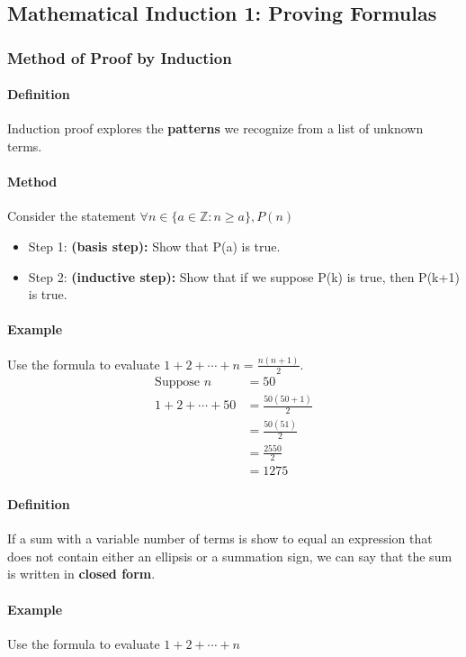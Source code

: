 \subsection{Mathematical Induction 1: Proving Formulas}
\hrulefill

\subsubsection*{Method of Proof by Induction}
\paragraph*{Definition}
Induction proof explores the \textbf{patterns} we recognize from a list of unknown terms.

\paragraph*{Method}
Consider the statement $\forall n \in \{a \in \mathbb{Z} : n \geq a\}, P(n)$
\begin{itemize}
    \item Step 1: \textbf{(basis step):} Show that P(a) is true.
    \item Step 2: \textbf{(inductive step):} Show that if we suppose P(k) is true, then P(k+1) is true.
\end{itemize}

\paragraph*{Example}
Use the formula to evaluate $1 + 2 + \cdots + n = \frac{n(n+1)}{2}$.
\begin{align*}
    \text{Suppose } n &= 50\\
    1 + 2 + \cdots + 50 &= \frac{50(50+1)}{2}\\
    &= \frac{50(51)}{2}\\
    &= \frac{2550}{2}\\
    &= 1275
\end{align*}


\paragraph*{Definition} If a sum with a variable number of terms is show to equal an expression that does not contain either an ellipsis 
or a summation sign, we can say that the sum is written in \textbf{closed form}.

\paragraph*{Example}
Use the formula to evaluate $1 + 2 + \cdots + n$

